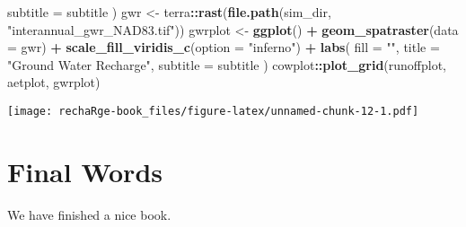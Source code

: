 \documentclass[
]{book}
\newenvironment{Shaded}{\begin{snugshade}}{\end{snugshade}}
\newcommand{\AttributeTok}[1]{\textcolor[rgb]{0.13,0.29,0.53}{#1}}
\newcommand{\FunctionTok}[1]{\textcolor[rgb]{0.13,0.29,0.53}{\textbf{#1}}}
\newcommand{\NormalTok}[1]{#1}
\newcommand{\OtherTok}[1]{\textcolor[rgb]{0.56,0.35,0.01}{#1}}
\newcommand{\SpecialCharTok}[1]{\textcolor[rgb]{0.81,0.36,0.00}{\textbf{#1}}}
\newcommand{\StringTok}[1]{\textcolor[rgb]{0.31,0.60,0.02}{#1}}
\begin{document}
\begin{Shaded}
\begin{Highlighting}[]
    \AttributeTok{subtitle =}\NormalTok{ subtitle}
\NormalTok{  )}
\NormalTok{gwr }\OtherTok{\textless{}{-}}\NormalTok{ terra}\SpecialCharTok{::}\FunctionTok{rast}\NormalTok{(}\FunctionTok{file.path}\NormalTok{(sim\_dir, }\StringTok{"interannual\_gwr\_NAD83.tif"}\NormalTok{))}
\NormalTok{gwrplot }\OtherTok{\textless{}{-}} \FunctionTok{ggplot}\NormalTok{() }\SpecialCharTok{+}
  \FunctionTok{geom\_spatraster}\NormalTok{(}\AttributeTok{data =}\NormalTok{ gwr) }\SpecialCharTok{+}
  \FunctionTok{scale\_fill\_viridis\_c}\NormalTok{(}\AttributeTok{option =} \StringTok{"inferno"}\NormalTok{) }\SpecialCharTok{+}
  \FunctionTok{labs}\NormalTok{(}
    \AttributeTok{fill =} \StringTok{""}\NormalTok{,}
    \AttributeTok{title =} \StringTok{"Ground Water Recharge"}\NormalTok{,}
    \AttributeTok{subtitle =}\NormalTok{ subtitle}
\NormalTok{  )}
\NormalTok{cowplot}\SpecialCharTok{::}\FunctionTok{plot\_grid}\NormalTok{(runoffplot, aetplot, gwrplot)}
\end{Highlighting}
\end{Shaded}

\texttt{[image: rechaRge-book\_files/figure-latex/unnamed-chunk-12-1.pdf]}

\hypertarget{final-words}{%
\chapter{Final Words}\label{final-words}}

We have finished a nice book.

  
\end{document}
